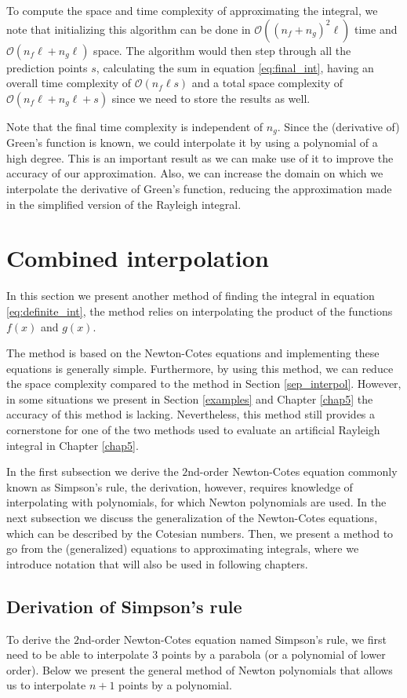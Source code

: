 To compute the space and time complexity of approximating the integral, we note that initializing this algorithm can be done in $\mathcal O((n_f+n_g)^2 \ell)$ time and $\mathcal O(n_f\ell + n_g\ell)$ space.
The algorithm would then step through all the prediction points $s$, calculating the sum in equation \ref{eq:final_int}, having an overall time complexity of $\mathcal O(n_f \ell s)$ and a total space complexity of $\mathcal O(n_f \ell + n_g \ell + s)$ since we need to store the results as well.

Note that the final time complexity is independent of $n_g$. Since the (derivative of) Green's function is known, we could interpolate it by using a polynomial of a high degree. This is an important result as we can make use of it to improve the accuracy of our approximation.
Also, we can increase the domain on which we interpolate the derivative of Green's function, reducing the approximation made in the simplified version of the Rayleigh integral.


\section{Combined interpolation}
\label{comb_interpol}
In this section we present another method of finding the integral in equation \ref{eq:definite_int}, the method relies on interpolating the product of the functions $f(x)$ and $g(x)$.

The method is based on the Newton-Cotes equations and implementing these equations is generally simple. Furthermore, by using this method, we can reduce the space complexity compared to the method in Section \ref{sep_interpol}. However, in some situations we present in Section \ref{examples} and Chapter \ref{chap5} the accuracy of this method is lacking.
Nevertheless, this method still provides a cornerstone for one of the two methods used to evaluate an artificial Rayleigh integral in Chapter \ref{chap5}.

In the first subsection we derive the $2$nd-order Newton-Cotes equation commonly known as Simpson's rule, the derivation, however, requires knowledge of interpolating with polynomials, for which Newton polynomials are used.
In the next subsection we discuss the generalization of the Newton-Cotes equations, which can be described by the Cotesian numbers.
Then, we present a method to go from the (generalized) equations to approximating integrals, where we introduce notation that will also be used in following chapters.

\subsection{Derivation of Simpson's rule}
\label{derivation_simpson}
To derive the $2$nd-order Newton-Cotes equation named Simpson's rule, we first need to be able to interpolate $3$ points by a parabola (or a polynomial of lower order).
Below we present the general method of Newton polynomials that allows us to interpolate $n+1$ points by a polynomial.

